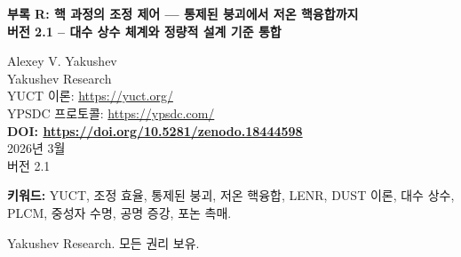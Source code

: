 \documentclass[11pt,a4paper]{article}
\theoremstyle{remark}
\newcommand{\Keff}{K_{\mathrm{eff}}}
\newcommand{\df}{d_{\!f}}
\newcommand{\Kcrit}{K_{\mathrm{crit}}}
\newcommand{\Sodd}{S_{\mathrm{odd}}}
\newcommand{\Seven}{S_{\mathrm{even}}}
\begin{document}
	
	\begin{titlepage}
		\centering
		\vspace*{0cm}
		
		\Huge\textbf{부록 R: 핵 과정의 조정 제어 — 통제된 붕괴에서 저온 핵융합까지} \\
		\vspace{0.5cm}
		\Large\textbf{버전 2.1 – 대수 상수 체계와 정량적 설계 기준 통합}
		\vspace{2cm}
		
		\large Alexey V. Yakushev\\
		Yakushev Research\\
		YUCT 이론: \url{https://yuct.org/}\\
		YPSDC 프로토콜: \url{https://ypsdc.com/}\\
		\vspace{1cm}
		\textbf{DOI: \url{https://doi.org/10.5281/zenodo.18444598}}\\
		\vspace{1cm}
		2026년 3월 \\ \large 버전 2.1
		\newpage
		\begin{abstract}
			\noindent
			본 부록은 Yakushev 통합 조정 이론 (YUCT)을 핵 및 아핵 과정으로 확장한다. 보편 오차 척도 법칙 \(\varepsilon = \kappa_c \alpha \Keff^{-\beta}\) (여기서 \(\beta = 2/3\), \(\kappa_c = 1/3\))으로부터 출발하여, 외부 장과 공명 여기 하에서 붕괴율, 터널링 확률 및 핵융합 단면적에 대한 수정을 유도한다. 핵심 결과는 저온 핵반응 (LENR, 저온 핵융합)에 대한 임계 조건이다: \(\Keff > \Kcrit = (E_{\text{Coulomb}}/E_{\text{coord}})^{\df}\). 최근 유도된 대수 상수 체계 \(\beta = 2/3\), \(\Sodd = 6/5 = 1.2\), \(\Seven = 4/5 = 0.8\) 및 그 관계 \(\Sodd+\Seven=2\), \(\Sodd/\Seven = 1/\beta = 3/2\)를 이용하여 정량적 설계 기준을 얻었다: 코히런트 (단방향) 상관의 비율은 60\%를 초과해야 하며, 코히런트 응답과 비코히런트 응답의 진폭 비는 1.5에 가까워야 한다. 이 기준들은 LENR을 추측적 탐색에서 측정 가능한 목표를 가진 공학적 과제로 전환시킨다. 우리는 이 상수들과 조정 물질 주기 라그랑지안 (PLCM)이 어떻게 체계적인 물질 스크리닝과 폐루프 제어를 가능하게 하는지 보여준다. 독립적 프레임워크 (DUST) 및 기존 실험적 단서 (이상 차폐, 핵 이성질체)와의 일관성을 논의한다. 단계적 로드맵을 제안하고 현실적 확률 추정치를 제시한다 (5-10년 내 성공 확률 30-40\%).
		\end{abstract}
		
		\vspace{0.3cm}
		
		\noindent
		\small\textbf{키워드:} YUCT, 조정 효율, 통제된 붕괴, 저온 핵융합, LENR, DUST 이론, 대수 상수, PLCM, 중성자 수명, 공명 증강, 포논 촉매.
		
		\vspace{0.1cm}
		
		\noindent
		 Yakushev Research. 모든 권리 보유.
	\end{titlepage}
	
\end{document}
